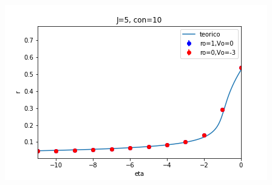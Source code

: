 \documentclass[a4paper]{article}
\begin{document}
\includegraphics[scale=0.7]{r_vs_eta_J5_con10_2.png}\\
\end{document}
